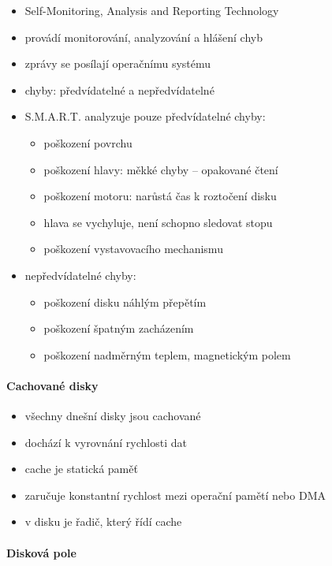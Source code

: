 \documentclass[a4paper,12pt]{article}
\providecommand{\tightlist}{%
\setlength{\itemsep}{0pt}\setlength{\parskip}{0pt}}
\begin{document}
\begin{itemize}
\tightlist
\item Self-Monitoring, Analysis and Reporting Technology
\item provádí monitorování, analyzování a hlášení chyb
\item zprávy se posílají operačnímu systému
\item chyby: předvídatelné a nepředvídatelné
\item S.M.A.R.T. analyzuje pouze předvídatelné chyby:

  \begin{itemize}
  \tightlist
  \item poškození povrchu
  \item poškození hlavy: měkké chyby -- opakované čtení
  \item poškození motoru: narůstá čas k roztočení disku
  \item hlava se vychyluje, není schopno sledovat stopu
  \item poškození vystavovacího mechanismu
  \end{itemize}
\item nepředvídatelné chyby:

  \begin{itemize}
  \tightlist
  \item poškození disku náhlým přepětím
  \item poškození špatným zacházením
  \item poškození nadměrným teplem, magnetickým polem
  \end{itemize}
\end{itemize}

\paragraph{Cachované disky}

\begin{itemize}
\tightlist
\item všechny dnešní disky jsou cachované
\item dochází k vyrovnání rychlosti dat
\item cache je statická paměť
\item zaručuje konstantní rychlost mezi operační pamětí nebo DMA
\item v disku je řadič, který řídí cache
\end{itemize}

\paragraph{Disková pole}
\end{document}
